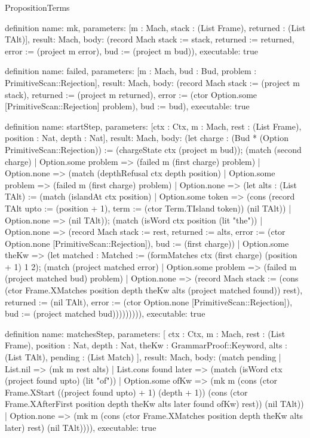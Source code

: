 \begin{lexlean}{PropositionTerms}
\begin{semanticmodule}
definition{
  name: mk,
  parameters: [m : Mach, stack : (List Frame), returned : (List TAlt)],
  result: Mach,
  body: (record Mach {stack := stack, returned := returned, error := (project m error), bud := (project m bud)}),
  executable: true
}

definition{
  name: failed,
  parameters: [m : Mach, bud : Bud, problem : PrimitiveScan::Rejection],
  result: Mach,
  body: (record Mach {stack := (project m stack), returned := (project m returned), error := (ctor Option.some [PrimitiveScan::Rejection] problem), bud := bud}),
  executable: true
}

definition{
  name: startStep,
  parameters: [ctx : Ctx, m : Mach, rest : (List Frame), position : Nat, depth : Nat],
  result: Mach,
  body: (let charge : (Bud * (Option PrimitiveScan::Rejection)) := (chargeState ctx (project m bud)); (match (second charge)
    | Option.some problem => (failed m (first charge) problem)
    | Option.none => (match (depthRefusal ctx depth position)
      | Option.some problem => (failed m (first charge) problem)
      | Option.none => (let alts : (List TAlt) := (match (islandAt ctx position)
        | Option.some token => (cons (record TAlt {upto := (position + 1), term := (ctor Term.TIsland token)}) (nil TAlt))
        | Option.none => (nil TAlt)); (match (isWord ctx position (lit "the"))
        | Option.none => (record Mach {stack := rest, returned := alts, error := (ctor Option.none [PrimitiveScan::Rejection]), bud := (first charge)})
        | Option.some theKw => (let matched : Matched := (formMatches ctx (first charge) (position + 1) 1 2); (match (project matched error)
          | Option.some problem => (failed m (project matched bud) problem)
          | Option.none => (record Mach {stack := (cons (ctor Frame.XMatches position depth theKw alts (project matched found)) rest), returned := (nil TAlt), error := (ctor Option.none [PrimitiveScan::Rejection]), bud := (project matched bud)})))))))),
  executable: true
}

definition{
  name: matchesStep,
  parameters: [
    ctx : Ctx,
    m : Mach,
    rest : (List Frame),
    position : Nat,
    depth : Nat,
    theKw : GrammarProof::Keyword,
    alts : (List TAlt),
    pending : (List Match)
  ],
  result: Mach,
  body: (match pending
    | List.nil => (mk m rest alts)
    | List.cons found later => (match (isWord ctx (project found upto) (lit "of"))
      | Option.some ofKw => (mk m (cons (ctor Frame.XStart ((project found upto) + 1) (depth + 1)) (cons (ctor Frame.XAfterFirst position depth theKw alts later found ofKw) rest)) (nil TAlt))
      | Option.none => (mk m (cons (ctor Frame.XMatches position depth theKw alts later) rest) (nil TAlt)))),
  executable: true
}


\end{semanticmodule}
\end{lexlean}
